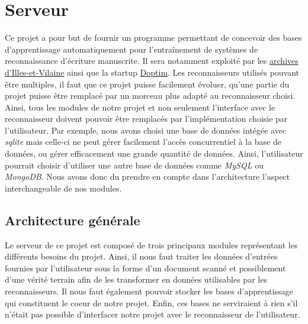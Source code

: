 \chapter{Serveur}

Ce projet a pour but de fournir un programme permettant de concevoir des bases d'apprentissage automatiquement pour l'entraînement de systèmes de reconnaissance d'écriture manuscrite. Il sera notamment exploité par les \href{http://archives.ille-et-vilaine.fr/fr}{archives d'Illes-et-Vilaine} ainsi que la startup \href{http://www.doptim.eu}{Doptim}. Les reconnaisseurs utilisés pouvant être multiples, il faut que ce projet puisse facilement évoluer, qu'une partie du projet puisse être remplacé par un morceau plus adapté au reconnaisseur choisi. Ainsi, tous les modules de notre projet et non seulement l'interface avec le reconnaisseur doivent pouvoir être remplacés par l'implémentation choisie par l'utilisateur. Par exemple, nous avons choisi une base de données intégée avec \textit{sqlite} mais celle-ci ne peut gérer facilement l'accès concurrentiel à la base de données, ou gérer efficacement une grande quantité de données. Ainsi, l'utilisateur pourrait choisir d'utiliser une autre base de données comme \textit{MySQL} ou \textit{MongoDB}. Nous avons donc du prendre en compte dans l'architecture l'aspect interchangeable de nos modules.

\section{Architecture générale}

Le serveur de ce projet est composé de trois principaux modules représentant les différents besoins du projet. Ainsi, il nous faut traiter les données d'entrées fournies par l'utilisateur sous la forme d'un document scanné et possiblement d'une vérité terrain afin de les transformer en données utilisables par les reconnaisseurs. Il nous faut également pouvoir stocker les bases d'apprentissage qui constituent le coeur de notre projet. Enfin, ces bases ne serviraient à rien s'il n'était pas possible d'interfacer notre projet avec le reconnaisseur de l'utilisateur.

